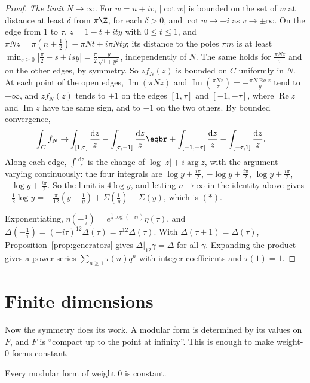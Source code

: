 \begin{proof}
\emph{The limit $N\to\infty$.} For $w=u+iv$, $|\cot w|$ is bounded on the set of $w$ at distance at least $\delta$ from $\pi\Z$, for each $\delta>0$, and $\cot w\to\mp i$ as $v\to\pm\infty$. On the edge from $1$ to $\tau$,
$z=1-t+ity$ with $0\le t\le1$, and $\pi Nz=\pi(n+\frac12)-\pi Nt+i\pi Nty$; its distance to the poles $\pi m$ is at least $\min_{s\ge0}|\frac\pi2-s+isy|=\frac\pi2\frac y{\sqrt{1+y^2}}$, independently of $N$. The same holds for $\frac{\pi Nz}\tau$ and on the other
edges, by symmetry. So $z f_N(z)$ is bounded on $C$ uniformly in $N$. At each point of the open edges, $\operatorname{Im}(\pi Nz)$ and $\operatorname{Im}(\frac{\pi Nz}\tau)=-\frac{\pi N\operatorname{Re}z}y$ tend to $\pm\infty$, and $zf_N(z)$ tends to
$+1$ on the edges $[1,\tau]$ and $[-1,-\tau]$, where $\operatorname{Re}z$ and $\operatorname{Im}z$ have the same sign, and to $-1$ on the two others. By bounded convergence,
\[
\begin{aligned}\int_Cf_N\to&\int_{[1,\tau]}\frac{\mathrm dz}z-\int_{[\tau,-1]}\frac{\mathrm dz}z\eqbr+\int_{[-1,-\tau]}\frac{\mathrm dz}z-\int_{[-\tau,1]}\frac{\mathrm dz}z.\end{aligned}
\]
Along each edge, $\int\frac{\mathrm dz}z$ is the change of $\log|z|+i\arg z$, with the argument varying continuously: the four integrals are $\log y+\frac{i\pi}2$, $-\log y+\frac{i\pi}2$, $\log y+\frac{i\pi}2$, $-\log y+\frac{i\pi}2$. So the limit is $4\log y$, and
letting $n\to\infty$ in the identity above gives $-\frac12\log y=-\frac\pi{12}(y-\frac1y)+\Sigma(\frac1y)-\Sigma(y)$, which is $(\ast)$.

Exponentiating, $\eta(-\frac1\tau)=e^{\frac12\log(-i\tau)}\eta(\tau)$, and $\Delta(-\frac1\tau)=(-i\tau)^{12}\Delta(\tau)=\tau^{12}\Delta(\tau)$. With $\Delta(\tau+1)=\Delta(\tau)$, Proposition~\ref{prop:generators} gives $\Delta|_{12}\gamma=\Delta$ for all $\gamma$.
Expanding the product gives a power series $\sum_{n\ge1}\tau(n)q^n$ with integer coefficients and $\tau(1)=1$.
\end{proof}

\section{Finite dimensions}

Now the symmetry does its work. A modular form is determined by its values on $F$, and $F$ is ``compact up to the point at infinity''. This is enough to make weight-$0$ forms constant.

\begin{lemma}\label{lem:weight0}
Every modular form of weight $0$ is constant.
\end{lemma}


